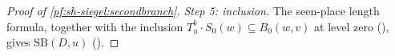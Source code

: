 \begin{proof}[Proof of \cref{pf:sh-siegel:secondbranch}]
\emph{Step 5: inclusion.} The seen-place length formula, together with the inclusion $T_u^b\cdot S_0(w)\subseteq B_0(w,v)$ at level
zero (), gives $\mathrm{SB}(D,u)$
().
\end{proof}

